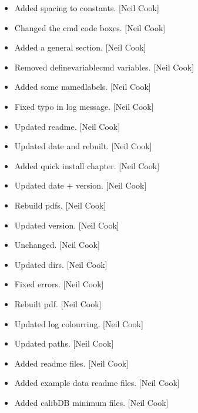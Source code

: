 \documentclass[a4paper,10pt,english]{report}
\begin{document}
\begin{itemize}
\item {} 
Added spacing to constants. {[}Neil Cook{]}

\item {} 
Changed the cmd code boxes. {[}Neil Cook{]}

\item {} 
Added a general section. {[}Neil Cook{]}

\item {} 
Removed definevariablecmd variables. {[}Neil Cook{]}

\item {} 
Added some namedlabels. {[}Neil Cook{]}

\item {} 
Fixed typo in log message. {[}Neil Cook{]}

\item {} 
Updated readme. {[}Neil Cook{]}

\item {} 
Updated date and rebuilt. {[}Neil Cook{]}

\item {} 
Added quick install chapter. {[}Neil Cook{]}

\item {} 
Updated date + version. {[}Neil Cook{]}

\item {} 
Rebuild pdfs. {[}Neil Cook{]}

\item {} 
Updated version. {[}Neil Cook{]}

\item {} 
Unchanged. {[}Neil Cook{]}

\item {} 
Updated dirs. {[}Neil Cook{]}

\item {} 
Fixed errors. {[}Neil Cook{]}

\item {} 
Rebuilt pdf. {[}Neil Cook{]}

\item {} 
Updated log colourring. {[}Neil Cook{]}

\item {} 
Updated paths. {[}Neil Cook{]}

\item {} 
Added readme files. {[}Neil Cook{]}

\item {} 
Added example data readme files. {[}Neil Cook{]}

\item {} 
Added calibDB minimum files. {[}Neil Cook{]}


\end{itemize}
\end{document}
